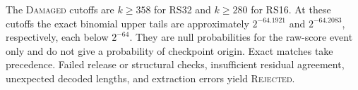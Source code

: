 The \textsc{Damaged} cutoffs are $k\ge358$ for RS32 and $k\ge280$ for RS16. At these cutoffs the exact binomial upper tails are approximately $2^{-64.1921}$ and $2^{-64.2083}$, respectively, each below $2^{-64}$. They are null probabilities for the raw-score event only and do not give a probability of checkpoint origin. Exact matches take precedence. Failed release or structural checks, insufficient residual agreement, unexpected decoded lengths, and extraction errors yield \textsc{Rejected}.

